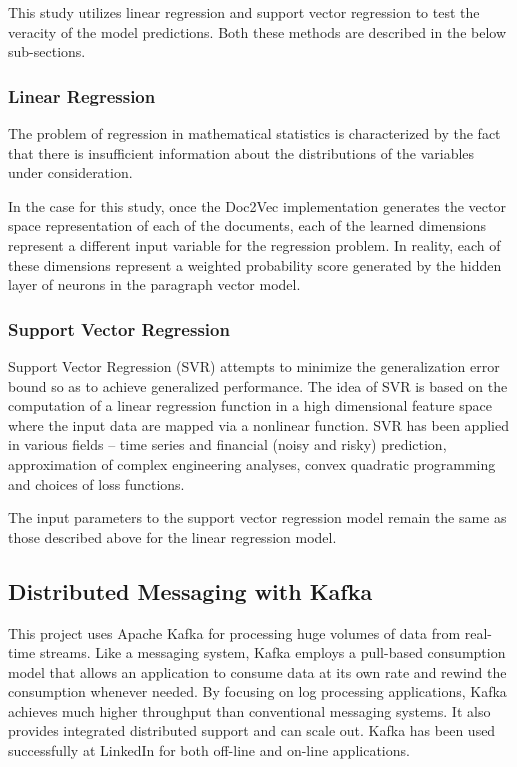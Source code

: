 \documentclass[conference]{IEEEtran}
\begin{document}
        This study utilizes linear regression and support vector regression to test the veracity of the model predictions.
        Both these methods are described in the below sub-sections.

        \subsubsection{Linear Regression}
            The problem of regression in mathematical statistics is characterized by the fact that there is insufficient information about the distributions of the variables under consideration\cite{regression_analysis}.

            In the case for this study, once the Doc2Vec implementation generates the vector space representation of each of the documents, each of the learned dimensions represent a different input variable for the regression problem. In reality, each of these dimensions represent a weighted probability score generated by the hidden layer of neurons in the paragraph vector model.

        \subsubsection{Support Vector Regression}
            Support Vector Regression (SVR) attempts to minimize the generalization error bound so as to achieve generalized performance. The idea of SVR is based on the computation of a linear regression function in a high dimensional feature space where the input data are mapped via a nonlinear function. SVR has been applied in various fields – time series and financial (noisy and risky) prediction, approximation of complex engineering analyses, convex quadratic programming and choices of loss functions\cite{basak2007support}.

            The input parameters to the support vector regression model remain the same as those described above for the linear regression model.

    \subsection{Distributed Messaging with Kafka}
        This project uses Apache Kafka for processing huge volumes of data from real-time streams.
        Like a messaging system, Kafka employs a pull-based consumption model that allows an application to consume data at its own rate and rewind the consumption whenever needed. 
        By focusing on log processing applications, Kafka achieves much higher throughput than conventional messaging systems. 
        It also provides integrated distributed support and can scale out. 
        Kafka has been used successfully at LinkedIn for both off-line and on-line applications.\cite{kreps2011kafka}
\end{document}
